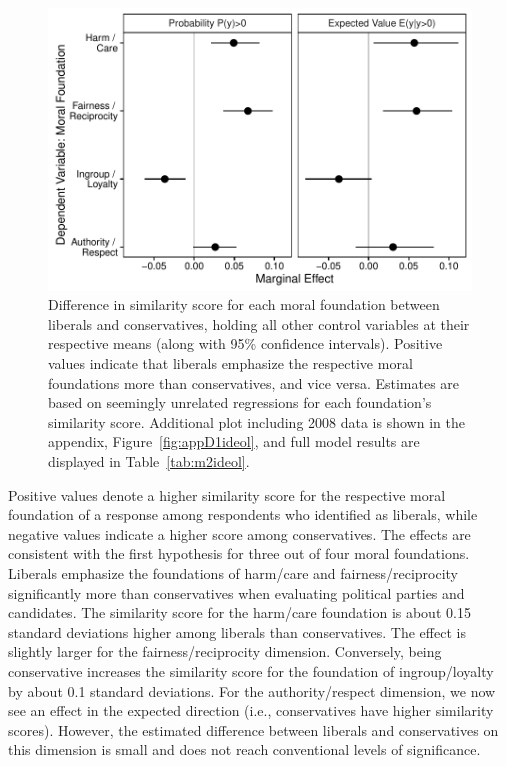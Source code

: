 \documentclass[12pt]{article}
\begin{document}
\begin{figure}[h]\centering
\includegraphics[scale=.9]{../calc/fig/fig2ideol.pdf}
\caption{Difference in similarity score for each moral foundation between liberals and conservatives, holding all other control variables at their respective means (along with 95\% confidence intervals). Positive values indicate that liberals emphasize the respective moral foundations more than conservatives, and vice versa. Estimates are based on seemingly unrelated regressions for each foundation's similarity score. Additional plot including 2008 data is shown in the appendix, Figure~\ref{fig:appD1ideol}, and full model results are displayed in Table~\ref{tab:m2ideol}.}\label{fig:2ideol}
\end{figure}

Positive values denote a higher similarity score for the respective moral foundation of a response among respondents who identified as liberals, while negative values indicate a higher score among conservatives. The effects are consistent with the first hypothesis for three out of four moral foundations. Liberals emphasize the foundations of harm/care and fairness/reciprocity significantly more than conservatives when evaluating political parties and candidates. The similarity score for the harm/care foundation is about 0.15 standard deviations higher among liberals than conservatives. The effect is slightly larger for the fairness/reciprocity dimension. Conversely, being conservative increases the similarity score for the foundation of ingroup/loyalty by about 0.1 standard deviations. For the authority/respect dimension, we now see an effect in the expected direction (i.e., conservatives have higher similarity scores). However, the estimated difference between liberals and conservatives on this dimension is small and does not reach conventional levels of significance.
\end{document}

